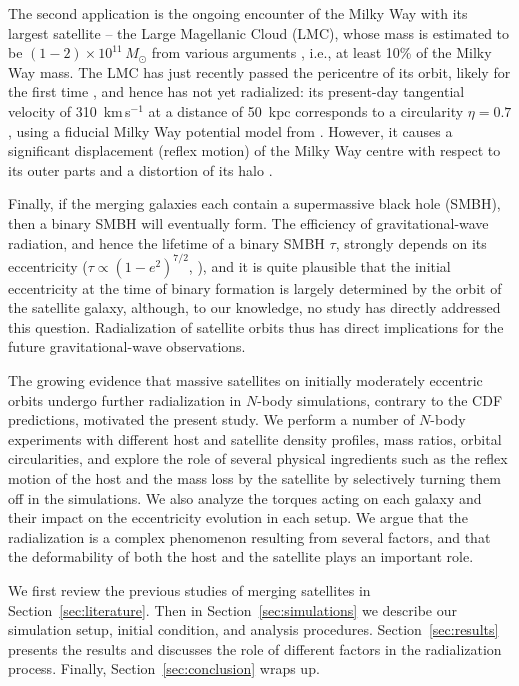 \documentclass[twocolumn]{aastex63}
\begin{document}
The second application is the ongoing encounter of the Milky Way with its largest satellite -- the Large Magellanic Cloud (LMC), whose mass is estimated to be $(1-2)\times10^{11}\,M_\odot$ from various arguments \citep[e.g.,][and references therein]{Erkal2019}, i.e., at least 10\% of the Milky Way mass. The LMC has just recently passed the pericentre of its orbit, likely for the first time \citep[e.g.,][]{Besla2007}, and hence has not yet radialized: its present-day tangential velocity of 310~km\,s$^{-1}$ \citep{Luri2021} at a distance of 50~kpc corresponds to a circularity $\eta=0.7$, using a fiducial Milky Way potential model from \citet{McMillan2017}. However, it causes a significant displacement (reflex motion) of the Milky Way centre with respect to its outer parts \citep{Gomez2015,Petersen2020,Petersen2021,Erkal2021} and a distortion of its halo \citep{GaravitoCamargo2019,GaravitoCamargo2021,Cunningham2020}.

Finally, if the merging galaxies each contain a supermassive black hole (SMBH), then a binary SMBH will eventually form. The efficiency of gravitational-wave radiation, and hence the lifetime of a binary SMBH $\tau$, strongly depends on its eccentricity ($\tau \propto (1-e^2)^{7/2}$, \citealt{Peters1964}), and it is quite plausible that the initial eccentricity at the time of binary formation is largely determined by the orbit of the satellite galaxy, although, to our knowledge, no study has directly addressed this question. Radialization of satellite orbits thus has direct implications for the future gravitational-wave observations.

The growing evidence that massive satellites on initially moderately eccentric orbits undergo further radialization in $N$-body simulations, contrary to the CDF predictions, motivated the present study. We perform a number of $N$-body experiments with different host and satellite density profiles, mass ratios, orbital circularities, and explore the role of several physical ingredients such as the reflex motion of the host and the mass loss by the satellite by selectively turning them off in the simulations. We also analyze the torques acting on each galaxy and their impact on the eccentricity evolution in each setup. We argue that the radialization is a complex phenomenon resulting from several factors, and that the deformability of both the host and the satellite plays an important role.

We first review the previous studies of merging satellites in Section~\ref{sec:literature}. Then in Section~\ref{sec:simulations} we describe our simulation setup, initial condition, and analysis procedures. Section~\ref{sec:results} presents the results and discusses the role of different factors in the radialization process. Finally, Section~\ref{sec:conclusion} wraps up.
\end{document}
